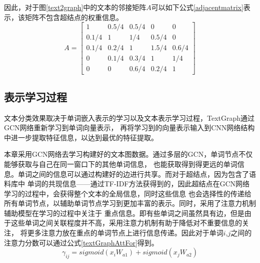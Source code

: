 因此，对于图\ref{text2graph}中的文本的邻接矩阵$A$可以如下公式\ref{adjacentmatrix}表示，该矩阵不包含超结点的权重信息。
\begin{equation}
    \label{adjacentmatrix}
    A=\left[
    {\begin{array}{*{20}{c}}
     {\text{1}}&{{\text{0}}{\text{.5/4}}}&{{\text{0}}{\text{.5/4}}}&{\text{0}}&{\text{0}} \\
     {{\text{0}}{\text{.1/4}}}&{\text{1}}&{\text{1/4}}&{{\text{0}}{\text{.5/4}}}&{\text{0}} \\
     {{\text{0}}{\text{.1/4}}}&{{\text{0}}{\text{.2/4}}}&{\text{1}}&{{\text{1}}{\text{.5/4}}}&{{\text{0}}{\text{.6/4}}} \\
     {\text{0}}&{{\text{0}}{\text{.1/4}}}&{{\text{0}}{\text{.3/4}}}&{\text{1}}&{\text{1/4}} \\
     {\text{0}}&{\text{0}}&{{\text{0}}{\text{.6/4}}}&{{\text{0}}{\text{.2/4}}}&{\text{1}}
    \end{array}}
    \right]
    \end{equation}

\subsection{表示学习过程}
文本分类效果取决于单词嵌入表示的学习以及文本表示学习过程，TextGraph通过GCN网络重新学习到单词向量表示，
再将学习到的向量表示输入到CNN网络结构中进一步提取特征信息，以达到最优的特征提取。

本章采用GCN网络去学习构建好的文本图数据。通过多层的GCN，单词节点不仅能够获取与自己在同一窗口下的其他单词信息，
也能获取得到得更远的单词信息。单词之间的信息可以通过构建好的边进行共享。而对于超结点，因为包含了语料库中
单词的共现信息——通过TF-IDF方法获得到的，因此超结点在GCN网络学习的过程中，会获得整个文本的全局信息，同时这些信息
也会选择性的传递给所有单词节点，以辅助单词节点学习到更加丰富的表示。同时，采用了注意力机制辅助模型在学习的过程中关注于
重点信息。即有些单词之间虽然具有边，但是由于这些单词之间关联程度并不高，采用注意力机制有助于降低对不重要信息的关注，
将更多注意力放在重点的单词节点上进行信息传递。因此对于单词$i$,$j$之间的注意力分数可以通过公式\ref{textGraphAttFor}得到。
\begin{equation}\label{textGraphAttFor}
    \gamma_{ij}=sigmoid(x_iW_{a1})+sigmoid(x_jW_{a2})
\end{equation}


